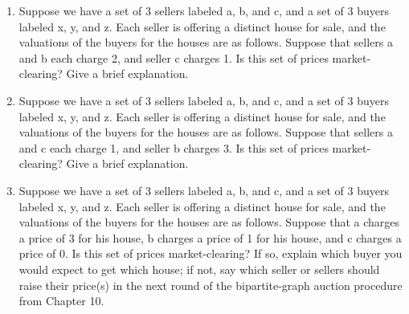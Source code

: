 \documentclass[11pt]{article}
\begin{document}
\begin{enumerate}
	\item  Suppose we have a set of 3 sellers labeled a, b, and c, and a set of 3 buyers labeled x, y, and z. Each seller is offering a distinct house for sale, and the valuations of the buyers for the houses are as follows.
Suppose that sellers a and b each charge 2, and seller c charges 1. Is this set of prices
market-clearing? Give a brief explanation.

		
	\item Suppose we have a set of 3 sellers labeled a, b, and c, and a set of 3 buyers labeled x, y, and z. Each seller is offering a distinct house for sale, and the valuations of the buyers for the houses are as follows.
Suppose that sellers a and c each charge 1, and seller b charges 3. Is this set of prices market-clearing? Give a brief explanation.

	
 \item Suppose we have a set of 3 sellers labeled a, b, and c, and a set of 3 buyers labeled x, y, and z. Each seller is offering a distinct house for sale, and the valuations of the buyers for the houses are as follows.
Suppose that a charges a price of 3 for his house, b charges a price of 1 for his house, and c charges a price of 0. Is this set of prices market-clearing? If so, explain which buyer you would expect to get which house; if not, say which seller or sellers should raise their price(s) in the next round of the bipartite-graph auction procedure from Chapter 10.

\end{enumerate}
\end{document}
